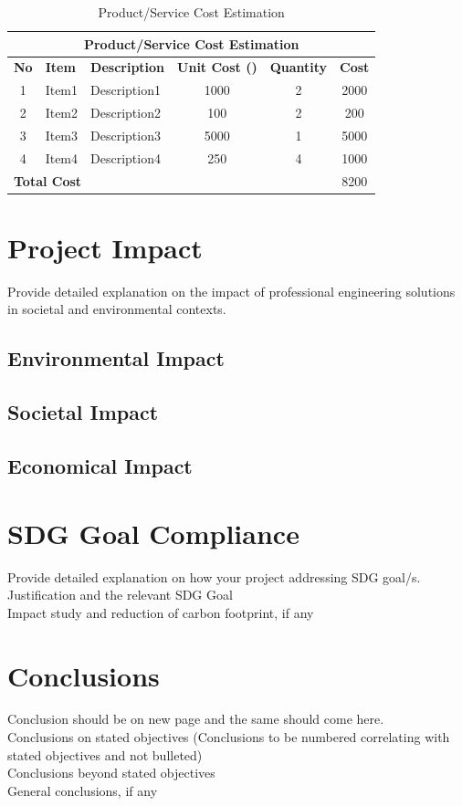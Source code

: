 \begin{table}[h]
	\centering
	\caption{Product/Service Cost Estimation}
	\begin{tabular}{|c|p{2.5cm}|p{4.5cm}|c|c|c|}
		\hline
		\multicolumn{6}{|c|}{\textbf{Product/Service Cost Estimation}} \\
		\hline
		\textbf{No}  & \textbf{Item} &  \textbf{Description} & \textbf{Unit  Cost (\rupee )} & \textbf{Quantity} & \textbf{Cost}\\
		\hline
		1  & Item1 &  Description1 & 1000 & 2 & 2000\\
		2  & Item2 &  Description2 & 100 & 2 & 200\\
		3  & Item3 &  Description3 & 5000 & 1 & 5000\\
		4  & Item4 &  Description4 & 250 & 4 & 1000\\
		\hline
		\multicolumn{5}{|l|}{\textbf{Total Cost}} & 8200\\
		\hline
	\end{tabular}%
	\label{tab:costestimation}%
\end{table}%


\section{Project Impact}
Provide detailed explanation on the impact of professional engineering
solutions in societal and environmental contexts. 
\subsection{Environmental Impact}
\subsection{Societal Impact}
\subsection{Economical Impact}

\section{SDG Goal Compliance}
Provide detailed explanation on how your project addressing SDG goal/s.\\ 
 Justification and the relevant SDG Goal\\
Impact study and reduction of carbon footprint, if any\\

\section{Conclusions}
Conclusion should be on new page and the same should come here.\\
Conclusions on stated objectives (Conclusions to be numbered correlating with stated objectives and not bulleted)\\
Conclusions beyond stated objectives\\
General conclusions, if any\\


